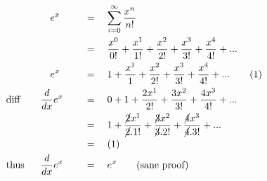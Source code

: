 \begin{alignat*}{5}
&\,&&\quad e^x\quad&&\,=\quad\sum_{i=0}^\infty\frac{x^n}{n!}\\
&\,&&\,&&\,=\quad\frac{x^0}{0!}+\frac{x^1}{1!}+\frac{x^2}{2!}+\frac{x^3}{3!}+\frac{x^4}{4!}+...\\
&\,&&\quad e^x\quad&&\,=\quad1+\frac{x^1}{1}+\frac{x^2}{2!}+\frac{x^3}{3!}+\frac{x^4}{4!}+...\quad&&(1)\\
&\mathrm{diff}\quad&&\frac{d}{dx}e^x\quad&&\,=\quad0+1+\frac{2x^1}{2!}+\frac{3x^2}{3!}+\frac{4x^3}{4!}+...\\
&\,&&\,&&\,=\quad1+\frac{\cancel{2}x^1}{\cancel{2}.1!}+\frac{\cancel{3}x^2}{\cancel{3}.2!}+\frac{\cancel{4}x^3}{\cancel{4}.3!}+...\\
&\,&&\,&&\,=\quad(1)\\
&\mathrm{thus}&&\frac{d}{dx}e^x\quad&&\,=\quad e^x\qquad\mathrm{(sane~proof)}
\end{alignat*}
